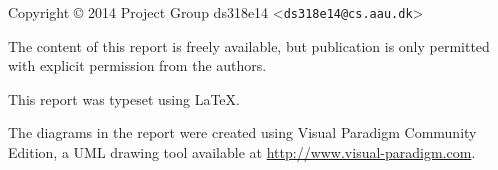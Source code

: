 \thispagestyle{empty}
{\small
\strut\vfill %
\noindent Copyright \copyright{} 2014 Project Group ds318e14 <\nolinkurl{ds318e14@cs.aau.dk}>
\vspace{0.2cm}

\noindent The content of this report is freely available, but publication is only permitted with explicit permission from the authors.
\vspace{0.2cm}

\noindent This report was typeset using \LaTeX.
\vspace{0.2cm}

\noindent The diagrams in the report were created using Visual Paradigm Community Edition, a UML drawing tool available at \url{http://www.visual-paradigm.com}.
}
\clearpage
